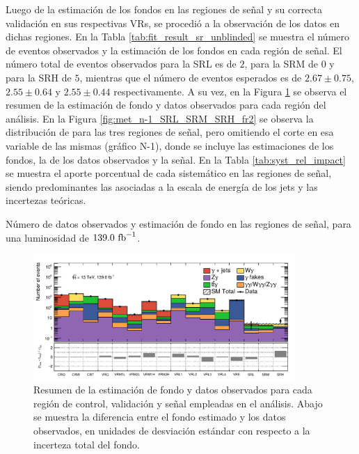 Luego de la estimación de los fondos en las regiones de señal y su correcta validación en sus respectivas VRs, se procedió a la observación de los datos en dichas regiones. En la Tabla \ref{tab:fit_result_sr_unblinded} se muestra el número de eventos observados y la estimación de los fondos en cada región de señal. El número total de eventos observados para la SRL es de $2$, para la SRM de $0$ y para la SRH de $5$, mientras que el número de eventos esperados es de $2.67\pm0.75$, $2.55\pm0.64$ y $2.55\pm0.44$ respectivamente. A su vez, en la Figura \ref{fig:regions_pulls_unblinded} se observa el resumen de la estimación de fondo y datos observados para cada región del análisis. En la Figura \ref{fig:met_n-1_SRL_SRM_SRH_fr2} se observa la distribución de \met para las tres regiones de señal, pero omitiendo el corte en esa variable de las mismas (gráfico N-1), donde se incluye las estimaciones de los fondos, la de los datos observados y la señal. En la Tabla \ref{tab:syst_rel_impact} se muestra el aporte porcentual de cada sistemático en las regiones de señal, siendo predominantes las asociadas a la escala de energía de los jets y las incertezas teóricas.


\begin{table}[!ht]
  \centering
  \caption{Número de datos observados y estimación de fondo en las regiones de señal, para una luminosidad de $139.0\ \text{fb}^{-1}$.}
  
  \label{tab:fit_result_sr_unblinded}
\end{table}

\begin{figure}[!ht]
  \centering
  \includegraphics[width=0.89\textwidth]{images/results/fr2_unblind/regions_pull_v2_2.pdf}
  \caption{Resumen de la estimación de fondo y datos observados para cada región de control, validación y señal empleadas en el análisis. Abajo se muestra la diferencia entre el fondo estimado y los datos observados, en unidades de desviación estándar con respecto a la incerteza total del fondo.}
  \label{fig:regions_pulls_unblinded}
\end{figure}


